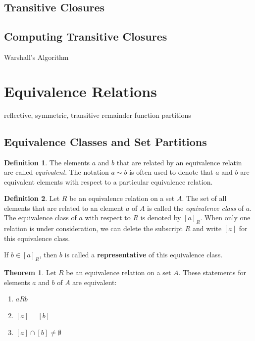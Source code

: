 \documentclass[11pt]{book} %
\theoremstyle {definition}
\newtheorem {definition}{Definition}[section]
\newtheorem {theorem}{Theorem}[section]
\theoremstyle {remark}
\begin{document}
  \subsection{Transitive Closures}
  \subsection{Computing Transitive Closures} Warshall's Algorithm


\section {Equivalence Relations}
reflective, symmetric, transitive
remainder function partitions

    \subsection {Equivalence Classes and Set Partitions}

\begin{definition}
The elements $a$ and $b$ that are related by an equivalence relatin are called \textit{equivalent}. The notation $a \sim b$ is often used to denote that $a$ and $b$ are equivalent elements with respect to a particular equivalence relation.
\end{definition}

\begin{definition}
Let $R$ be an equivalence relation on a set $A$. The set of all elements that are related to an element $a$ of $A$ is called the \textit{equivalence class} of $a$. The equivalence class of $a$ with respect to $R$ is denoted by $[a]_R$. When only one relation is under consideration, we can delete the subscript $R$ and write $[a]$ for this equivalence class.

If $b \in [a]_R$, then $b$ is called a \textbf{representative} of this equivalence class.
\end{definition}


\begin{theorem}
Let $R$ be an equivalence relation on a set $A$. These statements for elements $a$ and $b$ of $A$ are equivalent:
\begin{enumerate}[label=(\roman*)]
\item
$aRb$
\item
$[a]=[b]$
\item
$[a] \cap [b] \neq \emptyset$
\end{enumerate}
\end{theorem}
\end{document}
